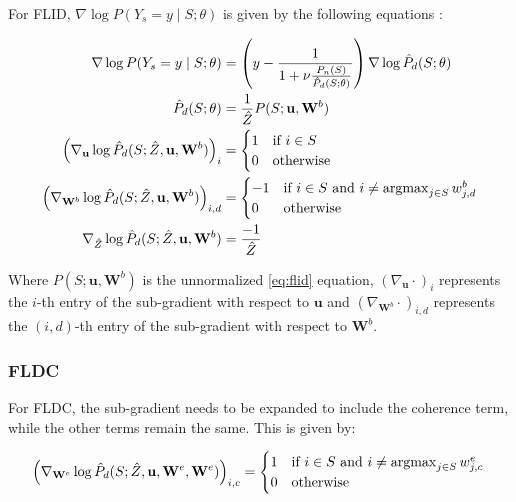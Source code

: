 For FLID, $\nabla \log{P(Y_{s} = y \mid S;\theta)}$ is given by the following equations \citep{tschiatschek16learning}:

\begin{align}
  \nabla \log{P(Y_{s} = y \mid S;\theta)} &= \left(y - \frac{1}{1 + \nu \frac{P_{n}(S)}{\hat{P}_{d}(S;\theta)}}\right) \nabla \log{\hat{P}_{d}(S;\theta)} \\
  \hat{P}_{d}(S;\theta) &= \frac{1}{\hat{Z}}P(S; \mathbf{u}, \mathbf{W}^{b}) \\
  \left(\nabla_{\mathbf{u}}\log{\hat{P}_{d}(S; \hat{Z}, \mathbf{u}, \mathbf{W}^{b})}\right)_{i} &= \begin{cases}
  1 &  \text{if}\ i \in S \\
  0 & \text{otherwise}
  \end{cases} \\
  \left(\nabla_{\mathbf{W}^{b}}\log{\hat{P}_{d}(S; \hat{Z}, \mathbf{u}, \mathbf{W}^{b})}\right)_{i,d} &= \begin{cases}
    -1 & \text{if}\ i \in S\ \text{and}\ i \neq \operatorname*{argmax}_{j \in S}{w^{b}_{j,d}} \\
     0 & \text{otherwise}
  \end{cases} \\
  \nabla_{\hat{Z}}\log{\hat{P}_{d}(S; \hat{Z}, \mathbf{u}, \mathbf{W}^{b})}&= \frac{-1}{\hat{Z}}
\end{align}

Where $P(S;\mathbf{u}, \mathbf{W}^{b})$ is the unnormalized \ref{eq:flid} equation, $\left(\nabla_{\mathbf{u}}\cdot \right)_{i}$ represents the $i$-th entry of the sub-gradient with respect to $\mathbf{u}$ and $\left(\nabla_{\mathbf{W}^{b}}\cdot\right)_{i,d}$ represents the $(i,d)$-th entry of the sub-gradient with respect to $\mathbf{W}^{b}$.

\subsubsection{FLDC}

For FLDC, the sub-gradient needs to be expanded to include the coherence term, while the other terms remain the same. This is given by:

\begin{equation}
   \left(\nabla_{\mathbf{W}^{e}}\log{\hat{P}_{d}(S; \hat{Z}, \mathbf{u}, \mathbf{W}^{e}, \mathbf{W}^{e})}\right)_{i,c} = \begin{cases}
   1 & \text{if}\ i \in S\ \text{and}\ i \neq \operatorname*{argmax}_{j \in S}{w^{e}_{j,c}} \\
   0 & \text{otherwise}
   \end{cases} \label{eq:sub-fldc}\\
\end{equation}

